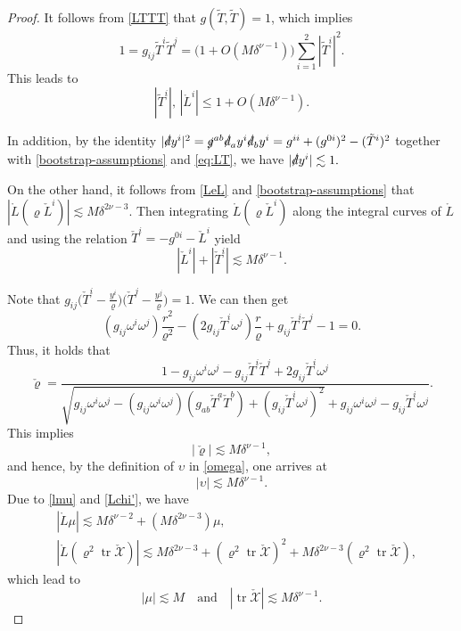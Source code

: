 \documentclass[11pt,twoside]{article}
\begin{document}
\begin{proof}
It follows from \eqref{LTTT} that $g(\tilde{T}, \tilde{T}) = 1$, which implies
 \[
 1 = g_{ij}\tilde{T}^i\tilde{T}^j = \big(1 + O(M\delta^{\nu-1})\big)\sum_{i=1}^2|\tilde{T}^i|^2.
 \]
This leads to
 \begin{equation}\label{eq:LT}
 |\tilde{T}^i|, \, |\mathring{L}^i| \leq 1 + O(M\delta^{\nu-1}).
 \end{equation}

 In addition, by the identity $|\slashed{d}y^i|^2 = \slashed{g}^{ab}\slashed{d}_a y^i\slashed{d}_b y^i = g^{ii} + (g^{0i})^2 - (\tilde{T}^i)^2$ together with \eqref{bootstrap-assumptions} and \eqref{eq:LT}, we have $|\slashed{d}y^i| \lesssim 1.$

 On the other hand, it follows from \eqref{LeL} and \eqref{bootstrap-assumptions} that $|\mathring{L}(\varrho\check{L}^i)|\lesssim M\delta^{2\nu-3}$. Then integrating $\mathring{L}(\varrho\check{L}^i)$ along the integral curves of $\mathring{L}$ and using the relation $\check{T}^i = -g^{0i} - \check{L}^i$ yield
 \[
 |\check{L}^i| + |\check{T}^i| \lesssim M\delta^{\nu-1}.
 \]

 Note that $g_{ij}\big(\check{T}^i - \frac{y^i}{\varrho}\big)\big(\check{T}^j - \frac{y^j}{\varrho}\big) = 1$. We can then get
 \[
 \left(g_{ij}\omega^i\omega^j\right)\frac{r^2}{\varrho^2} - \left(2g_{ij}\check{T}^i\omega^j\right)\frac{r}{\varrho} + g_{ij}\check{T}^i\check{T}^j - 1 = 0.
 \]
 Thus, it holds that
 \begin{equation}\label{rrho}
 \check{\varrho} = \frac{1 - g_{ij}\omega^i\omega^j - g_{ij}\check{T}^i\check{T}^j + 2g_{ij}\check{T}^i\omega^j}{\sqrt{g_{ij}\omega^i\omega^j - (g_{ij}\omega^i\omega^j)(g_{ab}\check{T}^a\check{T}^b) + (g_{ij}\check{T}^i\omega^j)^2} + g_{ij}\omega^i\omega^j - g_{ij}\check{T}^i\omega^j}.
 \end{equation}
 This implies
 \[
 |\check{\varrho}| \lesssim M\delta^{\nu-1},
 \]
 and hence, by the definition of $\upsilon$ in \eqref{omega}, one arrives at
 \[
 |\upsilon| \lesssim M\delta^{\nu-1}.
 \]
Due to \eqref{lmu} and \eqref{Lchi'}, we have
 \begin{equation}\label{YHCCC-X1}
\begin{split}
 &|\mathring{L}\mu| \lesssim M\delta^{\nu-2 } + (M\delta^{2\nu-3})\mu, \\
 &|\mathring{L}(\varrho^2\operatorname{tr}\check{\mathscr{X}})| \lesssim M\delta^{2\nu-3}
 +(\varrho^2\operatorname{tr}\check{\mathscr{X}})^2 + M\delta^{2\nu-3}(\varrho^2\operatorname{tr}\check{\mathscr{X}}),
 \end{split}
\end{equation}
 which lead to
 \[
 |\mu| \lesssim M \quad \text{and} \quad |\operatorname{tr}\check{\mathscr{X}}| \lesssim M\delta^{\nu-1}.
 \]
\end{proof}
\end{document}
